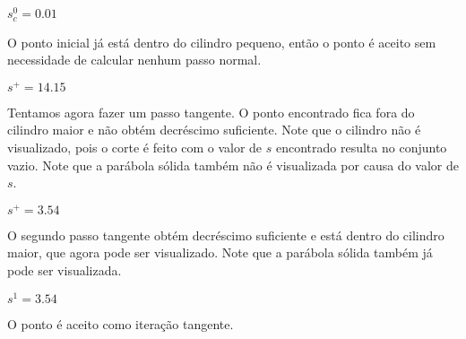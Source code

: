 \begin{center}

  $s_c^0 = 0.01$
\end{center}

\begin{center}
  \begin{minipage}{0.9\textwidth}
    O ponto inicial já está dentro do cilindro pequeno, então o ponto é aceito
    sem necessidade de calcular nenhum passo normal.
  \end{minipage}
\end{center}

\begin{center}

  $s^+ = 14.15$
\end{center}

\begin{center}
  \begin{minipage}{0.9\textwidth}
    Tentamos agora fazer um passo tangente. O ponto encontrado fica fora do cilindro
    maior e não obtém decréscimo suficiente. Note que o cilindro não é
    visualizado, pois o corte é feito com o valor de $s$ encontrado resulta no
    conjunto vazio. Note que a parábola sólida também não é visualizada por
    causa do valor de $s$.
  \end{minipage}
\end{center}

\begin{center}

  $s^+ = 3.54$
\end{center}

\begin{center}
  \begin{minipage}{0.9\textwidth}
  O segundo passo tangente obtém decréscimo suficiente e está dentro do cilindro
  maior, que agora pode ser visualizado. Note que a parábola sólida também já
  pode ser visualizada.
\end{minipage}
\end{center}

\begin{center}

  $s^1 = 3.54$
\end{center}

\begin{center}
  \begin{minipage}{0.9\textwidth}
    O ponto é aceito como iteração tangente.
  \end{minipage}
\end{center}

